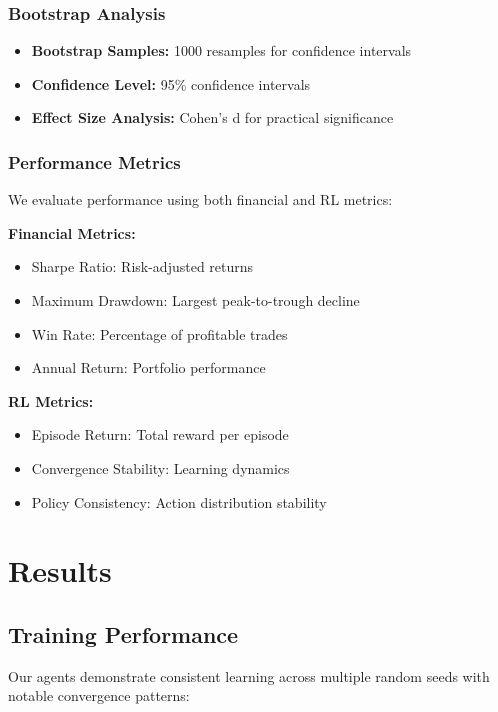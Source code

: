 \documentclass[10pt,journal]{IEEEtran}
\begin{document}
\subsubsection{Bootstrap Analysis}
\begin{itemize}
\item \textbf{Bootstrap Samples:} 1000 resamples for confidence intervals
\item \textbf{Confidence Level:} 95\% confidence intervals
\item \textbf{Effect Size Analysis:} Cohen's d for practical significance
\end{itemize}

\subsubsection{Performance Metrics}
We evaluate performance using both financial and RL metrics:

\textbf{Financial Metrics:}
\begin{itemize}
\item Sharpe Ratio: Risk-adjusted returns
\item Maximum Drawdown: Largest peak-to-trough decline
\item Win Rate: Percentage of profitable trades
\item Annual Return: Portfolio performance
\end{itemize}

\textbf{RL Metrics:}
\begin{itemize}
\item Episode Return: Total reward per episode
\item Convergence Stability: Learning dynamics
\item Policy Consistency: Action distribution stability
\end{itemize}

\section{Results}

\subsection{Training Performance}
Our agents demonstrate consistent learning across multiple random seeds with notable convergence patterns:
\end{document}
